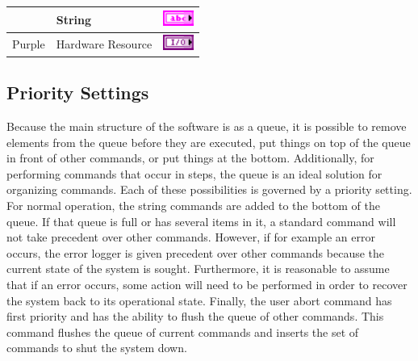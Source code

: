 \begin{table}[h]
\begin{tabular}{clc}
		& String								& \includegraphics[height=0.2in]{Figures/ColorCoding_String}				\\\hline
Purple	& Hardware Resource					& \includegraphics[height=0.2in]{Figures/ColorCoding_HardwareReference}	\\\hline
\end{tabular}\label{Tab:BPColorCoding}\end{table}











\subsection{Priority Settings}
Because the main structure of the software is as a queue, it is possible to remove elements from the queue before they are executed, put things on top of the queue in front of other commands, or put things at the bottom. Additionally, for performing commands that occur in steps, the queue is an ideal solution for organizing commands. Each of these possibilities is governed by a priority setting. For normal operation, the string commands are added to the bottom of the queue. If that queue is full or has several items in it, a standard command will not take precedent over other commands. However, if for example an error occurs, the error logger is given precedent over other commands because the current state of the system is sought. Furthermore, it is reasonable to assume that if an error occurs, some action will need to be performed in order to recover the system back to its operational state.  Finally, the user abort command has first priority and has the ability to flush the queue of other commands. This command flushes the queue of current commands and inserts the set of commands to shut the system down.


